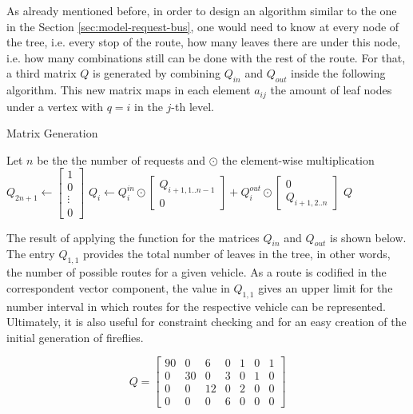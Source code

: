 \documentclass[tuberlin,cic,tc,openright,english,noabntcite,oneside]{iiufrgs}
\begin{document}
As already mentioned before, in order to design an algorithm similar to the one in the Section \ref{sec:model-request-bus}, one would need to know at every node of the tree, i.e. every stop of the route, how many leaves there are under this node, i.e. how many combinations still can be done with the rest of the route. For that, a third matrix $Q$ is generated by combining $Q_{in}$ and $Q_{out}$ inside the following algorithm. This new matrix maps in each element $a_{ij}$ the amount of leaf nodes under a vertex with $q=i$ in the $j$-th level.
\begin{algorithm}[H]
\caption{Matrix Generation}
\begin{algorithmic}
\State Let $n$ be the the number of requests and $\odot$ the element-wise multiplication
\State $\displaystyle Q_{2n+1} \gets \begin{bmatrix}1\\ 0 \\ \vdots \\0 \end{bmatrix}$
	\State $\displaystyle Q_{i} \gets Q^{in}_{i} \odot \begin{bmatrix}Q_{i+1,1..n-1} \\ 0\end{bmatrix}
	+ Q^{out}_{i} \odot \begin{bmatrix}0\\ Q_{i+1,2..n}\end{bmatrix}$
\EndFor
\State \Return $Q$
\EndFunction
\end{algorithmic}
\end{algorithm}

The result of applying the function for the matrices $Q_{in}$ and $Q_{out}$ is shown below. The entry $Q_{1,1}$ provides the total number of leaves in the tree, in other words, the number of possible routes for a given vehicle. As a route is codified in the correspondent vector component, the value in $Q_{1,1}$ gives an upper limit for the number interval in which routes for the respective vehicle can be represented. Ultimately, it is also useful for constraint checking and for an easy creation of the initial generation of fireflies.

$$
Q = 
\begin{bmatrix}
90 & 0 & 6 & 0 & 1 & 0 & 1\\
0 & 30 & 0 & 3 & 0 & 1 & 0\\
0 & 0 & 12 & 0 & 2 & 0 & 0\\
0 & 0 & 0 & 6 & 0 & 0 & 0
\end{bmatrix}
$$
\end{document}
